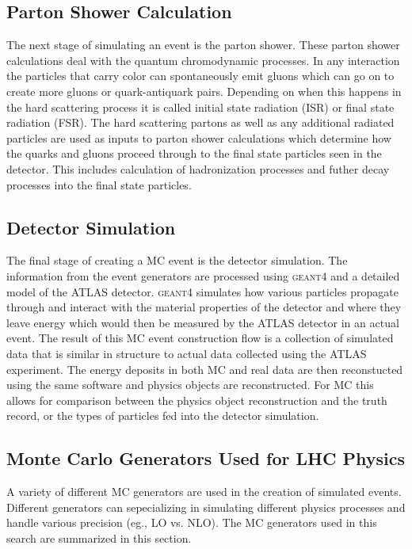\subsection{Parton Shower Calculation}
The next stage of simulating an event is the parton shower.  These parton shower calculations deal with the quantum chromodynamic processes.  In any interaction the particles that carry color can spontaneously emit gluons which can go on to create more gluons or quark-antiquark pairs.  Depending on when this happens in the hard scattering process it is called initial state radiation (ISR) or final state radiation (FSR).   The hard scattering partons as well as any additional radiated particles are used as inputs to parton shower calculations which determine how the quarks and gluons proceed through to the final state particles seen in the detector.  This includes calculation of hadronization processes and futher decay processes into the final state particles.

\subsection{Detector Simulation}
The final stage of creating a MC event is the detector simulation.  The information from the event generators are processed using \textsc{geant4} \cite{Geant4} and a detailed model of the ATLAS detector.  \textsc{geant4} simulates how various particles propagate through and interact with the material properties of the detector and where they leave energy which would then be measured by the ATLAS detector in an actual event.  The result of this MC event construction flow is a collection of simulated data that is similar in structure to actual data collected using the ATLAS experiment.  The energy deposits in both MC and real data are then reconstucted using the same software and physics objects are reconstructed.  For MC this allows for comparison between the physics object reconstruction and the truth record, or the types of particles fed into the detector simulation.

\subsection{Monte Carlo Generators Used for LHC Physics}

A variety of different MC generators are used in the creation of simulated events.  Different generators can sepecializing in simulating different physics processes and handle various precision (eg., LO vs. NLO). The MC generators used in this search are summarized in this section.

